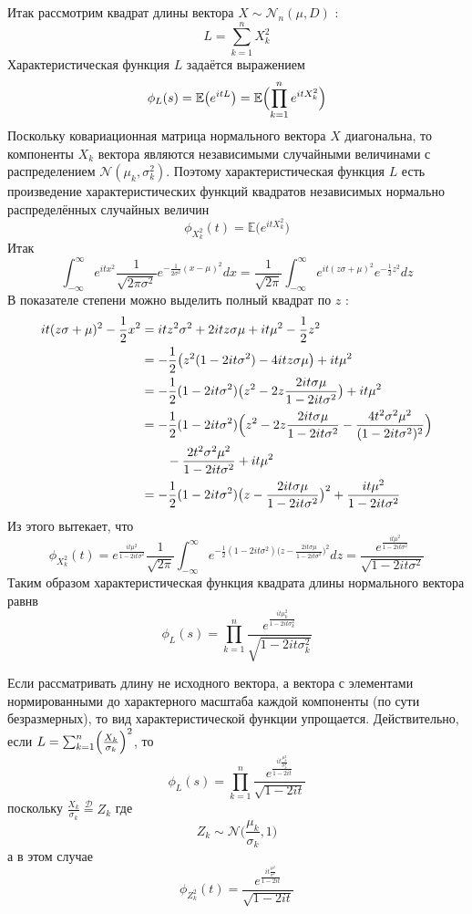 \documentclass[a4paper]{article}
\newcommand{\Ncal}{\mathcal{N}}
\newcommand{\Dcal}{\mathcal{D}}
\newcommand{\ex}[0]{{\mathbb{E}}}
\begin{document}
Итак рассмотрим квадрат длины вектора $X\sim \Ncal_n(\mu,D)$ :
\[L = \sum_{k=1}^n X_k^2\]
Характеристическая функция $L$ задаётся выражением
\[
\phi_L(s)
= \ex\bigl(e^{itL}\bigr)
= \ex\Bigl(\prod_{k=1}^n e^{i t X_k^2}\Bigr)
\]
Поскольку ковариационная матрица нормального вектора $X$ диагональна, то компоненты
$X_k$ вектора являются независимыми случайными величинами с распределением
$\Ncal(\mu_k,\sigma_k^2)$. Поэтому характеристическая функция $L$ есть произведение
характеристических функций квадратов независимых нормально распределённых
случайных величин
\[\phi_{X_k^2}(t) = \ex\bigl(e^{it X_k^2}\bigr)\]
Итак
\[
\int_{-\infty}^\infty e^{itx^2} \frac{1}{\sqrt{2\pi\sigma^2}} e^{-\frac{1}{2\sigma^2}(x-\mu)^2} dx
	= \frac{1}{\sqrt{2\pi}} \int_{-\infty}^\infty e^{it(z\sigma+\mu)^2} e^{-\frac{1}{2}z^2} dz
\]
В показателе степени можно выделить полный квадрат по $z$ :
\begin{align*}
it(z\sigma+\mu)^2 - \frac{1}{2}x^2
	&= it z^2\sigma^2 + 2itz\sigma\mu + it\mu^2 -\frac{1}{2}z^2 \\
	&=  -\frac{1}{2}\bigl(z^2(1 - 2 it \sigma^2) - 4itz\sigma\mu\bigr) + it\mu^2\\
	&=  -\frac{1}{2}(1 - 2 it \sigma^2)\bigl(z^2 - 2z\frac{2it\sigma\mu}{1 - 2 it \sigma^2}\bigr) + it\mu^2\\
	&=  -\frac{1}{2}(1 - 2 it \sigma^2)\Bigl(
			z^2 - 2z\frac{2it\sigma\mu}{1 - 2it\sigma^2} -\frac{4t^2\sigma^2\mu^2}{(1 - 2it\sigma^2)^2}
		\Bigr) \\
	&\quad\quad- \frac{2t^2\sigma^2\mu^2}{1 - 2it\sigma^2} + it\mu^2\\
	&=  -\frac{1}{2}(1 - 2it\sigma^2)\bigl(z - \frac{2it\sigma\mu}{1 - 2it\sigma^2}\bigr)^2
		+ \frac{it\mu^2}{1 - 2it\sigma^2}
\end{align*}
Из этого вытекает, что 
\[
\phi_{X_k^2}(t)
= e^\frac{it\mu^2}{1 - 2it\sigma^2} \frac{1}{\sqrt{2\pi}}
	\int_{-\infty}^\infty e^{-\frac{1}{2}(1 - 2it\sigma^2)\bigl(z - \frac{2it\sigma\mu}{1 - 2it\sigma^2}\bigr)^2} dz
= \frac{e^\frac{it\mu^2}{1 - 2it\sigma^2}}{\sqrt{1 - 2it\sigma^2}}
\]
Таким образом характеристическая функция квадрата длины нормального вектора равнв
\[\phi_L(s) = \prod_{k=1}^n \frac{e^\frac{it\mu_k^2}{1 - 2it\sigma_k^2}}{\sqrt{1 - 2it\sigma_k^2}}\]

Если рассматривать длину не исходного вектора, а вектора с элементами нормированными
до характерного масштаба каждой компоненты (по сути безразмерных), то вид
характеристической функции упрощается. Действительно, если
$L = \sum_{k=1}^n \Bigl(\frac{X_k}{\sigma_k}\Bigr)^2$, то
\[\phi_L(s) = \prod_{k=1}^n \frac{e^\frac{it\frac{\mu_k^2}{\sigma^2_k}}{1 - 2it}}{\sqrt{1 - 2it}}\]
поскольку $\frac{X_k}{\sigma_k} \overset{\Dcal}{=} Z_k$ где
\[Z_k \sim\Ncal\bigl(\frac{\mu_k}{\sigma_k},1\bigr)\]
а в этом случае
\[
\phi_{Z_k^2}(t) = \frac{e^\frac{it\frac{\mu^2}{\sigma^2}}{1 - 2it}}{\sqrt{1 - 2it}}
\]
\end{document}
